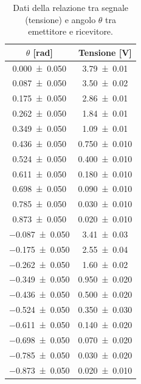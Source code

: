 \documentclass[a4paper]{article}
\begin{document}
\begin{table}[htbp]
\centering
\caption{Dati della relazione tra segnale (tensione) e angolo $\theta$ tra emettitore e ricevitore.}
\label{tab:dati_ampgeom_angolo}
\begin{tabular}{|c|c|}
\hline
$\theta$ [\si{\radian}] & Tensione [\si{\volt}] \\\hline\hline
\SI{0.000 \pm 0.050}{} & \SI{3.79 \pm 0.01}{} \\
\SI{0.087 \pm 0.050}{} & \SI{3.50 \pm 0.02}{} \\
\SI{0.175 \pm 0.050}{} & \SI{2.86 \pm 0.01}{} \\
\SI{0.262 \pm 0.050}{} & \SI{1.84 \pm 0.01}{} \\
\SI{0.349 \pm 0.050}{} & \SI{1.09 \pm 0.01}{} \\
\SI{0.436 \pm 0.050}{} & \SI{0.750 \pm 0.010}{} \\ %
\SI{0.524 \pm 0.050}{} & \SI{0.400 \pm 0.010}{} \\ %
\SI{0.611 \pm 0.050}{} & \SI{0.180 \pm 0.010}{} \\ %
\SI{0.698 \pm 0.050}{} & \SI{0.090 \pm 0.010}{} \\ %
\SI{0.785 \pm 0.050}{} & \SI{0.030 \pm 0.010}{} \\ %
\SI{0.873 \pm 0.050}{} & \SI{0.020 \pm 0.010}{} \\ %
\SI{-0.087 \pm 0.050}{} & \SI{3.41 \pm 0.03}{} \\
\SI{-0.175 \pm 0.050}{} & \SI{2.55 \pm 0.04}{} \\
\SI{-0.262 \pm 0.050}{} & \SI{1.60 \pm 0.02}{} \\
\SI{-0.349 \pm 0.050}{} & \SI{0.950 \pm 0.020}{} \\ %
\SI{-0.436 \pm 0.050}{} & \SI{0.500 \pm 0.020}{} \\ %
\SI{-0.524 \pm 0.050}{} & \SI{0.350 \pm 0.030}{} \\ %
\SI{-0.611 \pm 0.050}{} & \SI{0.140 \pm 0.020}{} \\ %
\SI{-0.698 \pm 0.050}{} & \SI{0.070 \pm 0.020}{} \\ %
\SI{-0.785 \pm 0.050}{} & \SI{0.030 \pm 0.020}{} \\ %
\SI{-0.873 \pm 0.050}{} & \SI{0.020 \pm 0.010}{} \\ %
\hline
\end{tabular}
\end{table}
\end{document}
